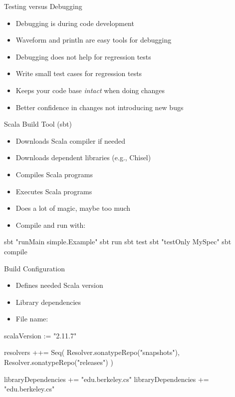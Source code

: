 \begin{frame}[fragile]{Testing versus Debugging}
\begin{itemize}
\item Debugging is during code development
\item Waveform and println are easy tools for debugging
\item Debugging does not help for regression tests
\item Write small test cases for regression tests
\item Keeps your code base \emph{intact} when doing changes
\item Better confidence in changes not introducing new bugs
\end{itemize}
\end{frame}

\begin{frame}[fragile]{Scala Build Tool (sbt)}
\begin{itemize}
\item Downloads Scala compiler if needed
\item Downloads dependent libraries (e.g., Chisel)
\item Compiles Scala programs
\item Executes Scala programs
\item Does a lot of magic, maybe too much
\item Compile and run with:
\end{itemize}
\begin{chisel}
sbt "runMain simple.Example"
sbt run
sbt test
sbt "testOnly MySpec"
sbt compile
\end{chisel}
\end{frame}

\begin{frame}[fragile]{Build Configuration}
\begin{itemize}
\item Defines needed Scala version
\item Library dependencies
\item File name: 
\end{itemize}
\begin{chisel}
scalaVersion := "2.11.7"

resolvers ++= Seq(
  Resolver.sonatypeRepo("snapshots"),
  Resolver.sonatypeRepo("releases")
)

libraryDependencies += "edu.berkeley.cs" %
libraryDependencies += "edu.berkeley.cs" %
\end{chisel}
\end{frame}


